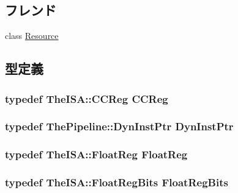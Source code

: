 \subsection*{フレンド}
\begin{DoxyCompactItemize}
\item 
class \hyperlink{classInOrderCPU_a0ebbdc315d2466b93b663656f9d9ab44}{Resource}
\end{DoxyCompactItemize}


\subsection{型定義}
\hypertarget{classInOrderCPU_a0c9de550a32808e6a25b54b6c791d5ab}{
\subsubsection[{CCReg}]{\setlength{\rightskip}{0pt plus 5cm}typedef TheISA::CCReg {\bf CCReg}}}
\label{classInOrderCPU_a0c9de550a32808e6a25b54b6c791d5ab}
\hypertarget{classInOrderCPU_af9d0c8a46736ba6aa2d8bb94da1a5e73}{
\subsubsection[{DynInstPtr}]{\setlength{\rightskip}{0pt plus 5cm}typedef {\bf ThePipeline::DynInstPtr} {\bf DynInstPtr}}}
\label{classInOrderCPU_af9d0c8a46736ba6aa2d8bb94da1a5e73}
\hypertarget{classInOrderCPU_a75484259f1855aabc8d74c6eb1cfe186}{
\subsubsection[{FloatReg}]{\setlength{\rightskip}{0pt plus 5cm}typedef TheISA::FloatReg {\bf FloatReg}}}
\label{classInOrderCPU_a75484259f1855aabc8d74c6eb1cfe186}
\hypertarget{classInOrderCPU_aab5eeae86499f9bfe15ef79360eccc64}{
\subsubsection[{FloatRegBits}]{\setlength{\rightskip}{0pt plus 5cm}typedef TheISA::FloatRegBits {\bf FloatRegBits}}}

